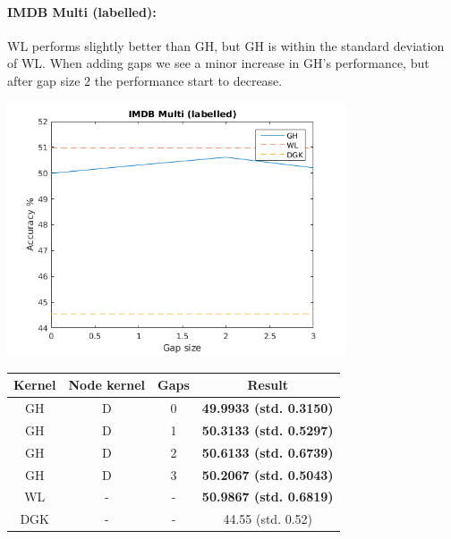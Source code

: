 \documentclass{article}
\begin{document}
\paragraph{IMDB Multi (labelled):}
WL performs slightly better than GH, but GH is within the standard deviation of WL. When adding gaps we see a minor increase in GH's performance, but after gap size $2$ the performance start to decrease. \\
\begin{minipage}{0.6\linewidth}
	\hspace*{-1in}
	\includegraphics[width=10cm]{imdb_multi_labelled}
	\label{fig:imdb_multi_labelled}
\end{minipage}
\begin{minipage}[c]{0.5\linewidth}	
	\centering
	\begin{tabular}{c|c|c|c}
		Kernel & Node kernel & Gaps & Result\\
		\hline
		GH & D & 0 & \textbf{49.9933 (std. 0.3150)} \\
		GH & D & 1 & \textbf{50.3133 (std. 0.5297)} \\
		GH & D & 2 & \textbf{50.6133 (std. 0.6739)} \\
		GH & D & 3 & \textbf{50.2067 (std. 0.5043)} \\
		WL & - & - & \textbf{50.9867 (std. 0.6819)}\\
		DGK\cite{yanardag} & - & - & 44.55 (std. 0.52) \\
	\end{tabular}
	\label{table:imdb_multi_labelled}
\end{minipage}
\end{document}

